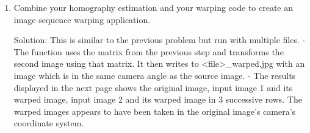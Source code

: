 \documentclass{article}
\begin{document}
\begin{enumerate}
		\item Combine your homography estimation and your warping code to create an image sequence warping application.
		
		Solution: This is similar to the previous problem but run with multiple files. \newline
		- The function uses the matrix from the previous step and transforms the second image using that matrix. It then writes to <file>\_warped.jpg with an image which is in the same camera angle as the source image. \newline
		- The results displayed in the next page shows the original image, input image 1 and its warped image, input image 2 and its warped image in 3 successive rows. The warped images appears to have been taken in the original image's camera's coordinate system.
		\newline 
		 

\end{enumerate}
\end{document}
